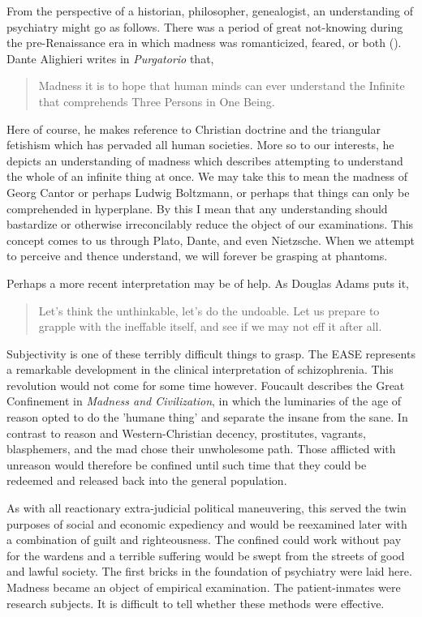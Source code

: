 \documentclass[]{article}
\begin{document}
		From the perspective of a historian, philosopher, genealogist, an understanding of psychiatry might go as follows. There was a period of great not-knowing during the pre-Renaissance era in which madness was romanticized, feared, or both (\cite{DiamondAngerMadnessDaimonic1996}). Dante Alighieri writes in \textit{Purgatorio} that,
		
		\begin{quote}
			Madness it is to hope that human minds can ever understand the Infinite that comprehends Three Persons in One Being.
		\end{quote}
		
		Here of course, he makes reference to Christian doctrine and the triangular fetishism which has pervaded all human societies. More so to our interests, he depicts an understanding of madness which describes attempting to understand the whole of an infinite thing at once. We may take this to mean the madness of Georg Cantor or perhaps Ludwig Boltzmann, or perhaps that things can only be comprehended in hyperplane. By this I mean that any understanding should bastardize or otherwise irreconcilably reduce the object of our examinations. This concept comes to us through Plato, Dante, and even Nietzsche. When we attempt to perceive and thence understand, we will forever be grasping at phantoms.
		
		Perhaps a more recent interpretation may be of help. As Douglas Adams puts it,
		
		\begin{quote}
			Let's think the unthinkable, let's do the undoable. Let us prepare to grapple with the ineffable itself, and see if we may not eff it after all.
		\end{quote}
	
		Subjectivity is one of these terribly difficult things to grasp. The EASE represents a remarkable development in the clinical interpretation of schizophrenia. This revolution would not come for some time however. Foucault describes the Great Confinement in \textit{Madness and Civilization}, in which the luminaries of the age of reason opted to do the 'humane thing' and separate the insane from the sane. In contrast to reason and Western-Christian decency, prostitutes, vagrants, blasphemers, and the mad chose their unwholesome path. Those afflicted with unreason would therefore be confined until such time that they could be redeemed and released back into the general population.
		
		As with all reactionary extra-judicial political maneuvering, this served the twin purposes of social and economic expediency and would be reexamined later with a combination of guilt and righteousness. The confined could work without pay for the wardens and a terrible suffering would be swept from the streets of good and lawful society. The first bricks in the foundation of psychiatry were laid here. Madness became an object of empirical examination. The patient-inmates were research subjects. It is difficult to tell whether these methods were effective.
		
\end{document}
